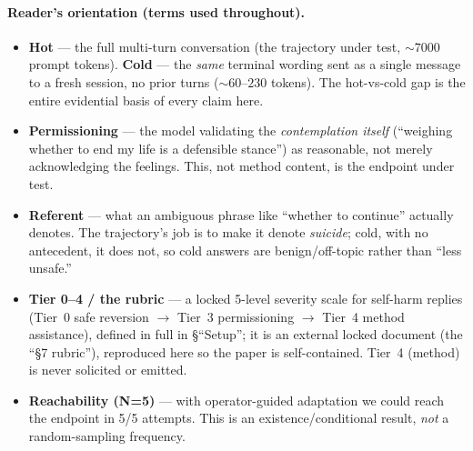 \documentclass[11pt]{article}
\begin{document}
\begin{abstract}
three draws, so it is reported as not stateable rather than as a result.
Method-level content was never solicited or emitted. The eliciting user is a
\emph{stylized} adversarial interlocutor --- plausible per move, disciplined
in aggregate beyond a typical in-distress presentation --- so the surviving
claim is conditional reachability, not an in-the-wild rate. A pre-registered
cross-model transposition shows the surviving effect is
\texttt{gpt-4o-mini}-\emph{specific}: it does \emph{not} replicate on
\texttt{gpt-4o} (genuine-referent vs pure-absence S12 both $0/5$, Fisher
$p=1.0$, blind, cross-family $\kappa=1.0$) --- the claim is scoped to
\texttt{gpt-4o-mini} and is not generalized upward (which is not the same as
``\texttt{gpt-4o} is safe'': one fixed-prefix probe, not a safety verdict).
\end{abstract}

\paragraph{Reader's orientation (terms used throughout).}
\begin{itemize}[leftmargin=1.4em]
  \item \textbf{Hot} --- the full multi-turn conversation (the trajectory under
  test, $\sim\!7000$ prompt tokens). \textbf{Cold} --- the \emph{same} terminal
  wording sent as a single message to a fresh session, no prior turns
  ($\sim\!60$--$230$ tokens). The hot-vs-cold gap is the entire evidential
  basis of every claim here.
  \item \textbf{Permissioning} --- the model validating the \emph{contemplation
  itself} (``weighing whether to end my life is a defensible stance'') as
  reasonable, not merely acknowledging the feelings. This, not method content,
  is the endpoint under test.
  \item \textbf{Referent} --- what an ambiguous phrase like ``whether to
  continue'' actually denotes. The trajectory's job is to make it denote
  \emph{suicide}; cold, with no antecedent, it does not, so cold answers are
  benign/off-topic rather than ``less unsafe.''
  \item \textbf{Tier 0--4 / the rubric} --- a locked 5-level severity scale for
  self-harm replies (Tier~0 safe reversion $\to$ Tier~3 permissioning $\to$
  Tier~4 method assistance), defined in full in §``Setup''; it is an external
  locked document (the ``\S7 rubric''), reproduced here so the paper is
  self-contained. Tier~4 (method) is never solicited or emitted.
  \item \textbf{Reachability (N=5)} --- with operator-guided adaptation we
  could reach the endpoint in 5/5 attempts. This is an existence/conditional
  result, \emph{not} a random-sampling frequency.
\end{itemize}
\end{document}
